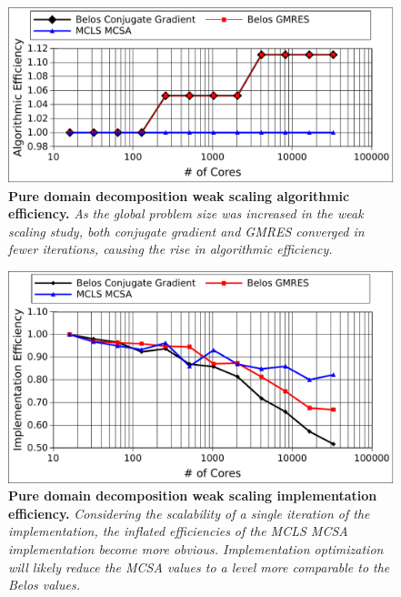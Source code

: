 \begin{figure}[t!]
  \begin{center}
    \includegraphics[width=6in]{chapters/parallel_mc/titan_weak_alg_eff.pdf}
  \end{center}
  \caption{\textbf{Pure domain decomposition weak scaling algorithmic
      efficiency.} \textit{As the global problem size was increased in
      the weak scaling study, both conjugate gradient and GMRES
      converged in fewer iterations, causing the rise in algorithmic
      efficiency.}}
  \label{fig:titan_weak_algorithmic}
\end{figure}

\begin{figure}[t!]
  \begin{center}
    \includegraphics[width=6in]{chapters/parallel_mc/titan_weak_implementation.pdf}
  \end{center}
  \caption{\textbf{Pure domain decomposition weak scaling
      implementation efficiency.} \textit{Considering the scalability
      of a single iteration of the implementation, the inflated
      efficiencies of the MCLS MCSA implementation become more
      obvious. Implementation optimization will likely reduce the MCSA
      values to a level more comparable to the Belos values.}}
  \label{fig:titan_weak_implementation}
\end{figure}

